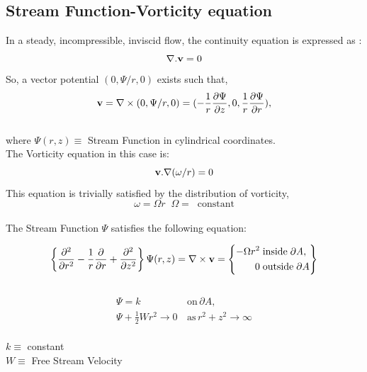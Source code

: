 \documentclass[10pt,a4paper,final]{report}
\begin{document}
\subsection{Stream Function-Vorticity equation}
In a steady, incompressible, inviscid flow, the continuity equation is expressed as :
\begin{equation}
	\nabla . {\bf v} = 0
\end{equation}
So, a vector potential $(0, \Psi/r, 0)$ exists such that,
\begin{equation}
	{\bf v} = \nabla\times(0, \Psi/r,0) = (-\frac{1}{r}\frac{\partial\Psi}{\partial z}, 0, \frac{1}{r}\frac{\partial\Psi}{\partial r}),
\end{equation}
\\
where $\Psi(r,z) \equiv $ Stream Function in cylindrical coordinates.
\\
The Vorticity equation in this case is:
\\
\begin{equation}
	{\bf v}.\nabla(\omega/r) = 0
\end{equation}
This equation is trivially satisfied by the distribution of vorticity, 
\begin{equation}
	\omega = \Omega r \;\; \Omega = \;\; \text{constant}
\end{equation}
\\
The Stream Function $\Psi$ satisfies the following equation: 

\begin{equation}
 \left\lbrace\frac{\partial^2}{\partial r^2} -	
 \frac{1}{r}\frac{\partial}{\partial r} +
 \frac{\partial^2}{\partial z^2}\right\rbrace \Psi(r,z) =
	\nabla \times {\bf v} =
 \left\{\begin{aligned} 
        -\Omega r^2 \; &\text{inside}\; \partial \emph{A},\\
        0 \; &\text{outside} \; \partial A
       \end{aligned}
 \right\}
\end{equation}
\\
\begin{equation}
\begin{aligned}
	\Psi = k \; &\text{on} \, \partial A, \\
	\Psi + \frac{1}{2} W r^2 \rightarrow 0 \, &\text{as} \, r^2 + z^2 \rightarrow \infty
\end{aligned}
\end{equation}
\\
$k \equiv $ constant \\
$W \equiv $ Free Stream Velocity
\end{document}
